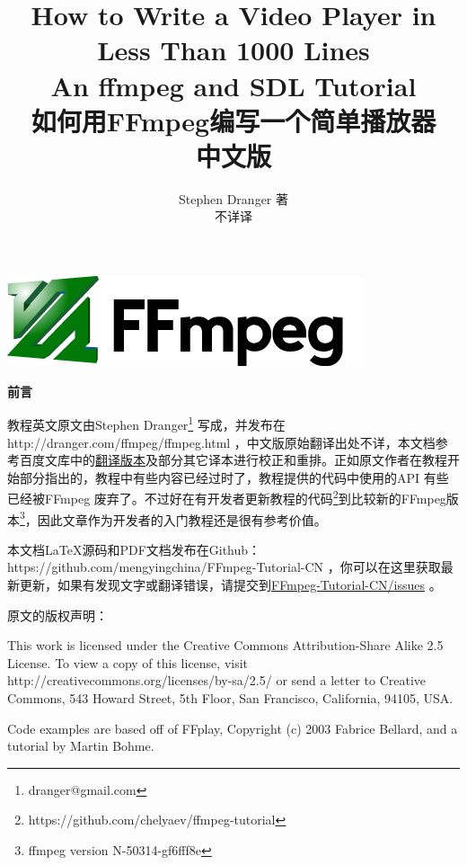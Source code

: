 \documentclass[12pt,a4paper,landscape,fancyhdr,fntef,oneside]{ctexbook}
\title{
\hfill{\small \textbf{How to Write a Video Player in
Less Than 1000 Lines}}\\
\hfill \textbf{An ffmpeg and SDL Tutorial}\\
\hfill \textbf{如何用FFmpeg编写一个简单播放器}\\
\hfill {\large\kaishu 中文版}}
\author{
        \hfill Stephen Dranger \quad 著\\
        \hfill 不详\quad 译\\
}
\makeatletter
\renewenvironment{quote}
                {\kaishu
                 \list{}{\rightmargin   2em
                         \listparindent 2em
                         \itemindent    2em
                         \parsep        0em}
                 \item\relax}
                {\endlist}
\def\printtitle{%
    {\huge {\@title}\par}}      %
\def\printauthor{%
    {\large \@author}}              %
\renewcommand\maketitle{%
  \newpage
  \thispagestyle{empty}


    \includegraphics[height=0.1314\textheight]{FFmpegnewlogo.png}\\ %

%
%
\begin{minipage}{\linewidth}
\begin{flushleft}
\vspace{.2\textheight}
\printtitle
\vspace{.2\textheight}
\printauthor
\end{flushleft}
\end{minipage}
\clearpage}
\makeatother
\begin{document}
\maketitle

\newpage
\thispagestyle{empty}
{\hfil \huge \textbf{前\hspace{2em}言}}\par
\vspace{.1\textheight}

教程英文原文由Stephen Dranger\footnote{dranger@gmail.com} 写成，并发布在http://dranger.com/ffmpeg/ffmpeg.html ，中文版原始翻译出处不详，本文档参考百度文库中的\href{http://wenku.baidu.com/view/2a30ffef0975f46527d3e1ac.html }{翻译版本}及部分其它译本进行校正和重排。正如原文作者在教程开始部分指出的，教程中有些内容已经过时了，教程提供的代码中使用的API 有些已经被FFmpeg 废弃了。不过好在有开发者更新教程的代码\footnote{https://github.com/chelyaev/ffmpeg-tutorial}到比较新的FFmpeg版本\footnote{ffmpeg version N-50314-gf6fff8e}，因此文章作为开发者的入门教程还是很有参考价值。

本文档LaTeX源码和PDF文档发布在Github：https://github.com/mengyingchina/FFmpeg-Tutorial-CN ，你可以在这里获取最新更新，如果有发现文字或翻译错误，请提交到\href{https://github.com/mengyingchina/FFmpeg-Tutorial-CN/issues}{FFmpeg-Tutorial-CN/issues} 。

\vspace{1em}
原文的版权声明：
\begin{quote}
\noindent This work is licensed under the Creative Commons Attribution-Share Alike 2.5 License. To view a copy of this license, visit http://creativecommons.org/licenses/by-sa/2.5/ or send a letter to Creative Commons, 543 Howard Street, 5th Floor, San Francisco, California, 94105, USA.

\noindent Code examples are based off of FFplay, Copyright (c) 2003 Fabrice Bellard, and a tutorial by Martin Bohme.
\end{quote}


\frontmatter
\tableofcontents

\mainmatter














\end{document}
